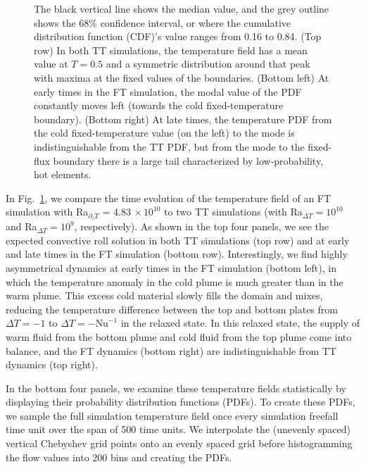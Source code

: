 \documentclass[aps, pre, onecolumn, nofootinbib, notitlepage, groupedaddress, amsfonts, amssymb, amsmath, longbibliography, superscriptaddress]{revtex4-1}
\begin{document}
\begin{figure}[p!]
{	The black vertical line shows the median value, and the grey outline shows the 68\% confidence interval, or where the cumulative distribution function (CDF)'s value ranges from 0.16 to 0.84.
	(Top row) In both TT simulations, the temperature field has a mean value at $T = 0.5$ and a symmetric distribution around that peak with maxima at the fixed values of the boundaries. 
	(Bottom left) At early times in the FT simulation, the modal value of the PDF constantly moves left (towards the cold fixed-temperature boundary).
	(Bottom right) At late times, the temperature PDF from the cold fixed-temperature value (on the left) to the mode is indistinguishable from the TT PDF, but from the mode to the fixed-flux boundary there is a large tail characterized by low-probability, hot elements.
	\label{fig:rbc_evolution_dynamics} }
\end{figure}

In Fig.~\ref{fig:rbc_evolution_dynamics}, we compare the time evolution of the temperature field of an FT simulation with Ra$_{\partial_z T}$ = 4.83$\,\times 10^{10}$ to two TT simulations (with Ra$_{\Delta T} = 10^{10}$ and Ra$_{\Delta T} = 10^9$, respectively).
As shown in the top four panels, we see the expected convective roll solution in both TT simulations (top row) and at early and late times in the FT simulation (bottom row).
Interestingly, we find highly asymmetrical dynamics at early times in the FT simulation (bottom left), in which the temperature anomaly in the cold plume is much greater than in the warm plume.
This excess cold material slowly fills the domain and mixes, reducing the temperature difference between the top and bottom plates from $\Delta T = -1$ to $\Delta T = -\text{Nu}^{-1}$ in the relaxed state.
In this relaxed state, the supply of warm fluid from the bottom plume and cold fluid from the top plume come into balance, and the FT dynamics (bottom right) are indistinguishable from TT dynamics (top right).

In the bottom four panels, we examine these temperature fields statistically by displaying their probability distribution functions (PDFs).
To create these PDFs, we sample the full simulation temperature field once every simulation freefall time unit over the span of 500 time units.
We interpolate the (unevenly spaced) vertical Chebyshev grid points onto an evenly spaced grid before histogramming the flow values into 200 bins and creating the PDFs.
\end{document}
